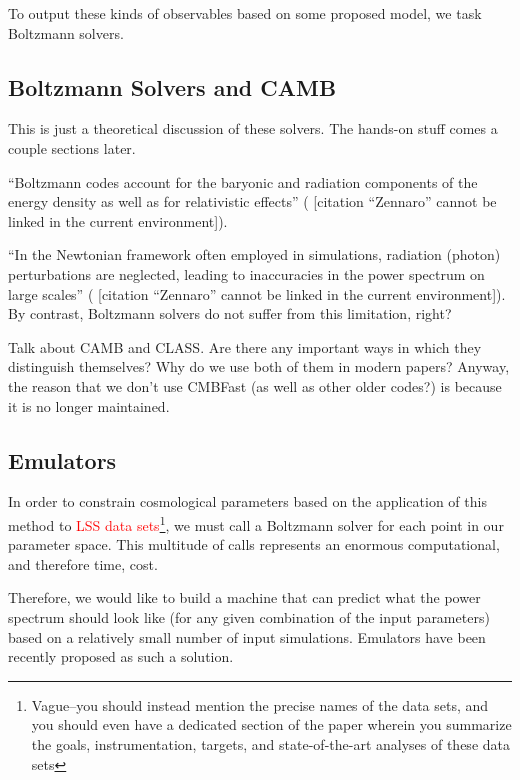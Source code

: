 \documentclass[11pt]{article}
\newcommand{\cbib}[1]
{\IfFileExists{biblatex.sty}
{\cite{#1}}
{[citation ``#1'' cannot be linked in the current environment]}}
\begin{document}
To output these kinds of observables based on some proposed model, we task
Boltzmann solvers.

\begin{centering}
\section{Boltzmann Solvers and CAMB}
\end{centering}

This is just a theoretical discussion of these solvers. The hands-on stuff
comes a couple sections later.

``Boltzmann codes account for the baryonic and radiation components of the
energy density as well as for relativistic effects'' (\cbib{Zennaro}).

``In the Newtonian framework often employed in simulations, radiation (photon)
perturbations are neglected, leading to inaccuracies in the power spectrum on
large scales'' (\cbib{Zennaro}). By contrast, Boltzmann solvers do not suffer
from this limitation, right?

Talk about CAMB and CLASS. Are there any important ways in which they
distinguish themselves? Why do we use both of them in modern papers? Anyway,
the reason that we don't use CMBFast (as well as other older codes?) is
because it is no longer maintained.

\begin{centering}
\section{Emulators}
\end{centering}

In order to constrain cosmological parameters based on the application of this
method to \textcolor{red}{LSS data sets}\footnote{
	Vague--you should instead mention the precise names of the data sets,
	and you should even have a dedicated section of the paper wherein you
	summarize the goals, instrumentation, targets, and state-of-the-art
	analyses of these data sets
}, we must call a Boltzmann solver for each point in our parameter space. This
multitude of calls represents an enormous computational, and therefore time,
cost.

Therefore, we would like to build a machine that can predict what the power
spectrum should look like (for any given combination of the input parameters)
based on a relatively small number of input simulations. Emulators have been
recently  proposed as such a solution.
\end{document}
